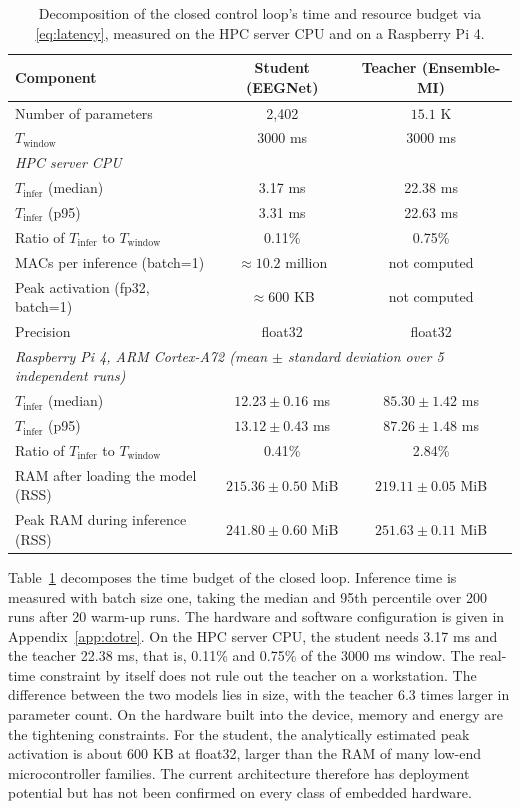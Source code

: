 \begin{table}[!htbp]
\centering
\caption{Decomposition of the closed control loop's time and
resource budget via \eqref{eq:latency}, measured on the HPC server
CPU and on a Raspberry Pi 4.}
\label{tab:tre}
\begin{tabular}{lcc}
\toprule
\textbf{Component} & \textbf{Student (EEGNet)} & \textbf{Teacher (Ensemble-MI)} \\
\midrule
Number of parameters & 2,402 & $15.1$ K \\
$T_{\mathrm{window}}$ & 3000 ms & 3000 ms \\
\midrule
\multicolumn{3}{l}{\textit{HPC server CPU}} \\
$T_{\mathrm{infer}}$ (median) & 3.17 ms & 22.38 ms \\
$T_{\mathrm{infer}}$ (p95) & 3.31 ms & 22.63 ms \\
Ratio of $T_{\mathrm{infer}}$ to $T_{\mathrm{window}}$ & 0.11\% & 0.75\% \\
MACs per inference (batch=1) & $\approx 10.2$ million & not computed \\
Peak activation (fp32, batch=1) & $\approx 600$ KB & not computed \\
Precision & float32 & float32 \\
\midrule
\multicolumn{3}{l}{\textit{Raspberry Pi 4, ARM Cortex-A72 (mean
$\pm$ standard deviation over 5 independent runs)}} \\
$T_{\mathrm{infer}}$ (median) & $12.23 \pm 0.16$ ms & $85.30 \pm 1.42$ ms \\
$T_{\mathrm{infer}}$ (p95) & $13.12 \pm 0.43$ ms & $87.26 \pm 1.48$ ms \\
Ratio of $T_{\mathrm{infer}}$ to $T_{\mathrm{window}}$ & 0.41\% & 2.84\% \\
RAM after loading the model (RSS) & $215.36 \pm 0.50$ MiB & $219.11 \pm 0.05$ MiB \\
Peak RAM during inference (RSS) & $241.80 \pm 0.60$ MiB & $251.63 \pm 0.11$ MiB \\
\bottomrule
\end{tabular}
\end{table}
\FloatBarrier

Table~\ref{tab:tre} decomposes the time budget of the closed loop.
Inference time is measured with batch size one, taking the median and
95th percentile over 200 runs after 20 warm-up runs. The hardware and
software configuration is given in Appendix~\ref{app:dotre}. On the HPC
server CPU, the student needs 3.17 ms and the teacher 22.38 ms, that is,
0.11\% and 0.75\% of the 3000 ms window. The real-time constraint by
itself does not rule out the teacher on a workstation. The difference
between the two models lies in size, with the teacher 6.3 times larger
in parameter count. On the hardware built into the device, memory and
energy are the tightening constraints. For the student, the
analytically estimated peak activation is about 600 KB at float32,
larger than the RAM of many low-end microcontroller families. The
current architecture therefore has deployment potential but has not
been confirmed on every class of embedded hardware.

